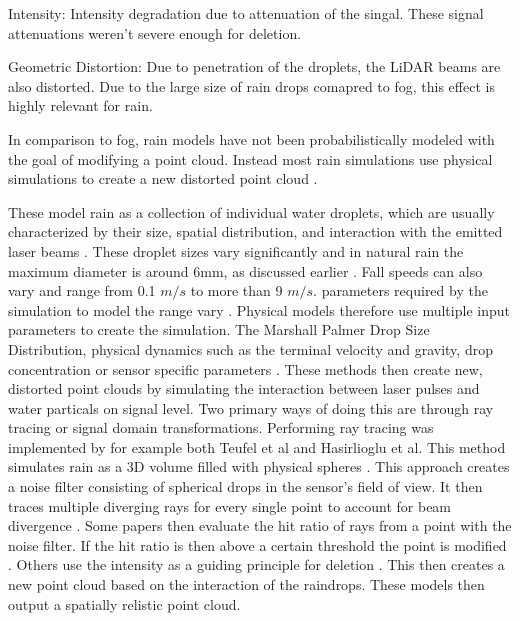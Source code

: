 Intensity: Intensity degradation due to attenuation of the singal. These signal attenuations weren't severe enough for deletion.

Geometric Distortion: Due to penetration of the droplets, the LiDAR beams are also distorted. Due to the large size of rain drops comapred to fog, this effect is highly relevant for rain. 

In comparison to fog, rain models have not been probabilistically modeled with the goal of modifying a point cloud. Instead most rain simulations use physical simulations to create a new distorted point cloud \cite{haider_methodology_2023} \cite{hasirlioglu_model-based_2018}. 

These model rain as a collection of individual water droplets, which are usually characterized by their size, spatial distribution, and interaction with the emitted laser beams \cite{haider_methodology_2023}.
These droplet sizes vary significantly and in natural rain the maximum diameter is around 6mm, as discussed earlier \cite{earlier}.
Fall speeds can also vary and range  from 0.1 $m/s$ to more than 9 $m/s$.
parameters required by the simulation to model the range vary \cite{FIND}. Physical models therefore use multiple input parameters to create the simulation. The Marshall Palmer Drop Size Distribution, physical dynamics such as the terminal velocity and gravity, drop concentration or sensor specific parameters \cite{zhao_method_2021} \cite{haider_methodology_2023}. 
These methods then create new, distorted point clouds by simulating the interaction between laser pulses and water particals on signal level. Two primary ways of doing this are through ray tracing or signal domain transformations. 
Performing ray tracing was implemented by for example both Teufel et al and Hasirlioglu et al. This method simulates rain as a 3D volume filled with physical spheres \cite{teufel_simulating_2022}. This approach creates a noise filter consisting of spherical drops in the sensor's field of view. It then traces multiple diverging rays for every single point to account for beam divergence \cite{teufel_simulating_2022}. Some papers then evaluate the hit ratio of rays from a point with the noise filter. If the hit ratio is then above a certain threshold the point is modified \cite{hasirlioglu_model-based_2018}. Others use the intensity as a guiding principle for deletion \cite{kilic_lidar_2021}. This then creates a new point cloud based on the interaction of the raindrops. These models then output a spatially relistic point cloud. 

